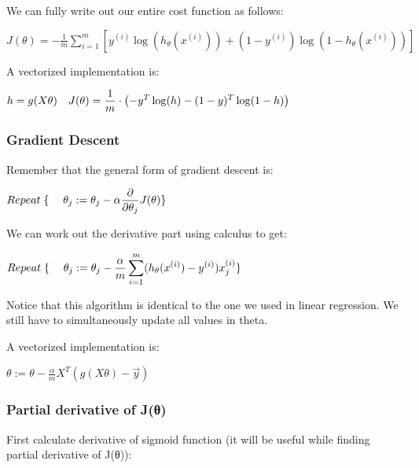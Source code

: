 \documentclass[
]{article}
\begin{document}
We can fully write out our entire cost function as follows:

\(J(\theta) = - \frac{1}{m} \displaystyle \sum_{i=1}^m [y^{(i)}\log (h_\theta (x^{(i)})) + (1 - y^{(i)})\log (1 - h_\theta(x^{(i)}))]\)

A vectorized implementation is:

{
\(\begin{align*} & h = g(X\theta)\newline & J(\theta) = \frac{1}{m} \cdot \left(-y^{T}\log(h)-(1-y)^{T}\log(1-h)\right) \end{align*}\)
}

\hypertarget{gradient-descent-1}{%
\subsubsection{Gradient Descent}\label{gradient-descent-1}}

Remember that the general form of gradient descent is:

\(\begin{align*}& Repeat \; \lbrace \newline & \; \theta_j := \theta_j - \alpha \dfrac{\partial}{\partial \theta_j}J(\theta) \newline & \rbrace\end{align*}\)

We can work out the derivative part using calculus to get:

\(\begin{align*} & Repeat \; \lbrace \newline & \; \theta_j := \theta_j - \frac{\alpha}{m} \sum_{i=1}^m (h_\theta(x^{(i)}) - y^{(i)}) x_j^{(i)} \newline & \rbrace \end{align*}\)

Notice that this algorithm is identical to the one we used in linear
regression. We still have to simultaneously update all values in theta.

A vectorized implementation is:

{ \(\theta := \theta - \frac{\alpha}{m} X^{T} (g(X \theta ) - \vec{y})\)
}

\hypertarget{partial-derivative-of-jux3b8}{%
\subsubsection{Partial derivative of
J(θ)}\label{partial-derivative-of-jux3b8}}

First calculate derivative of sigmoid function (it will be useful while
finding partial derivative of J(θ)):
\end{document}
